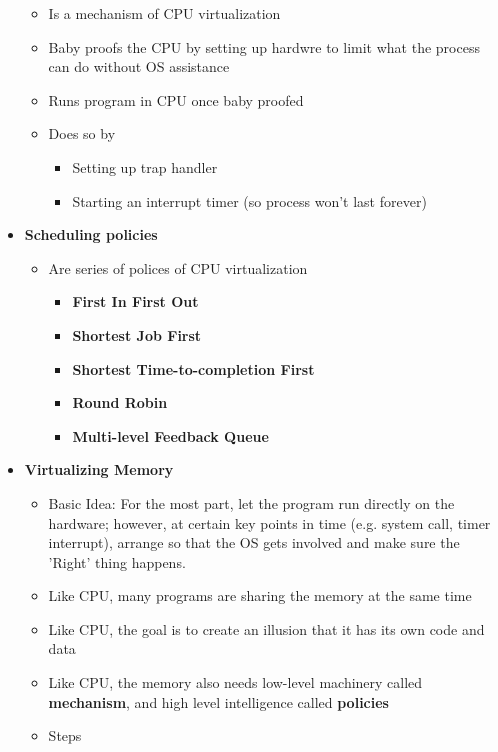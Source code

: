 \documentclass[12pt]{article}
\begin{document}
\begin{itemize}
    \begin{itemize}
        \item Is a mechanism of CPU virtualization
        \item Baby proofs the CPU by setting up hardwre to limit what the process can do without OS assistance
        \item Runs program in CPU once baby proofed
        \item Does so by
        \begin{itemize}
            \item Setting up trap handler
            \item Starting an interrupt timer (so process won't last forever)
        \end{itemize}
    \end{itemize}

    \item \textbf{Scheduling policies}

    \begin{itemize}
        \item Are series of polices of CPU virtualization

        \begin{itemize}
            \item \textbf{First In First Out}
            \item \textbf{Shortest Job First}
            \item \textbf{Shortest Time-to-completion First}
            \item \textbf{Round Robin}
            \item \textbf{Multi-level Feedback Queue}
        \end{itemize}
    \end{itemize}

    \item \textbf{Virtualizing Memory}
    \begin{itemize}
        \item Basic Idea: For the most part, let the program run directly on the hardware;
        however, at certain key points in time (e.g. system call, timer interrupt), arrange
        so that the OS gets involved and make sure the 'Right' thing happens.
        \item Like CPU, many programs are sharing the memory at the same time
        \item Like CPU, the goal is to create an illusion that it has its own code and data
        \item Like CPU, the memory also needs low-level machinery called \textbf{mechanism},
        and high level intelligence called \textbf{policies}
        \item Steps


\end{itemize}
\end{itemize}
\end{document}
